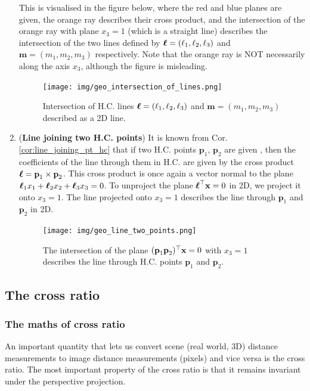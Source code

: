 \documentclass[a4paper]{article}
\begin{document}
\begin{enumerate}
    This is visualised in the figure below, where the red and blue planes are given, the orange ray describes their cross product, and the intersection of the orange ray with plane $x_3=1$ (which is a straight line) describes the intersection of the two lines defined by $\boldsymbol{\ell} = (\ell_1, \ell_2, \ell_3)$ and  $\textbf{m} = (m_1, m_2, m_3)$ respectively. Note that the orange ray is NOT necessarily along the axis $x_3$, although the figure is misleading.
    
    \begin{figure}[H]
        \centering
        \texttt{[image: img/geo\_intersection\_of\_lines.png]}
        \caption{Intersection of H.C. lines $\boldsymbol{\ell} = (\ell_1, \ell_2, \ell_3)$ and  $\textbf{m} = (m_1, m_2, m_3)$ described as a 2D line.}
    \end{figure}
    
    \item (\textbf{Line joining two H.C. points}) It is known from Cor. \ref{cor:line_joining_pt_hc} that if two H.C. points $\textbf{p}_1$, $\textbf{p}_2$ are given , then the coefficients of the line through them in H.C. are given by the cross product $\boldsymbol{\ell} = \textbf{p}_1 \times \textbf{p}_2$. This cross product is once again a vector normal to the plane $\boldsymbol{\ell}_1x_1 + \boldsymbol{\ell}_2x_2 + \boldsymbol{\ell}_3x_3 = 0$. To unproject the plane $\boldsymbol{\ell}^{\top}\textbf{x}=0$ in 2D, we project it onto $x_3=1$. The line projected onto $x_3=1$ describes the line through $\textbf{p}_1$ and $\textbf{p}_2$ in 2D.
    \begin{figure}[H]
        \centering
        \texttt{[image: img/geo\_line\_two\_points.png]}
        \caption{The intersection of the plane $(\textbf{p}_1\textbf{p}_2)^{\top}\textbf{x}=0$ with $x_3=1$ describes the line through H.C. points $\textbf{p}_1$ and $\textbf{p}_2$.}
    \end{figure}


\end{enumerate}




\subsection{The cross ratio}

\subsubsection{The maths of cross ratio}

An important quantity that lets us convert scene (real world, 3D) distance measurements to image distance measurements (pixels) and vice versa is the cross ratio. The most important property of the cross ratio is that it remains invariant under the perspective projection.
\end{document}
